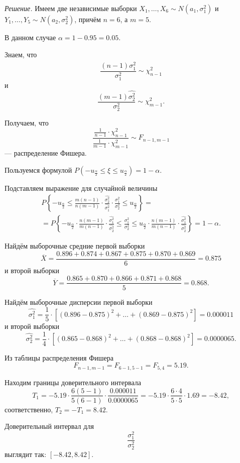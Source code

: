 \textit{Решение.}
Имеем две независимые выборки $X_1, \dotsc, X_6 \sim N \left( a_1, \sigma_1^2 \right) $ и
$Y_1, \dotsc, Y_5 \sim N \left( a_2, \sigma_2^2 \right) $, причём $n = 6$, а $m = 5$.

В данном случае $ \alpha = 1 - 0.95 = 0.05$.

Знаем, что
$$ \frac{ \left( n - 1 \right) \hat{ \sigma_1^2}}{ \sigma_1^2} \sim
  \chi_{n - 1}^2$$
и
$$ \frac{ \left( m - 1 \right) \hat{ \sigma_2^2}}{ \sigma_2^2} \sim
  \chi_{m - 1}^2.$$

Получаем, что
$$ \frac{ \frac{1}{n - 1} \cdot \chi_{n - 1}^2}{ \frac{1}{ m - 1} \cdot \chi_{m - 1}^2} \sim
  F_{n - 1, m - 1}$$
--- распределение Фишера.

Пользуемся формулой
$P \left( -u_{ \frac{ \alpha }{2}} \leq \xi \leq u_{ \frac{ \alpha }{2}} \right) =
  1 - \alpha $.

Подставляем выражение для случайной величины
\begin{equation*}
  \begin{split}
    P \left\{
      -u_{ \frac{ \alpha }{2}} \leq
      \frac{m \left( n - 1 \right) }{n \left( m - 1 \right) } \cdot
      \frac{ \hat{ \sigma_2^2}}{ \hat{ \sigma_1^2}} \cdot \frac{ \sigma_1^2}{ \sigma_2^2} \leq
      u_{ \frac{ \alpha }{2}}
    \right\} = \\
    = P \left\{
      -u_{ \frac{ \alpha }{2}} \cdot \frac{n \left( m - 1 \right) }{m \left( n - 1 \right) } \cdot
      \frac{ \hat{ \sigma_1^2}}{ \hat{ \sigma_2^2}} \leq
      \frac{ \sigma_1^2}{ \sigma_2^2} \leq
      u_{ \frac{ \alpha }{2}} \cdot \frac{n \left( m - 1 \right) }{m \left( n - 1 \right) } \cdot
      \frac{ \hat{ \sigma_1^2}}{ \hat{ \sigma_2^2}}
    \right\} =
    1 - \alpha.
  \end{split}
\end{equation*}

Найдём выборочные средние первой выборки
$$ \overline{X} =
  \frac{0.896 + 0.874 + 0.867 + 0.875 + 0.870 + 0.869}{6} =
  0.875$$
и второй выборки
$$ \overline{Y} =
  \frac{0.865 + 0.870 + 0.866 + 0.871 + 0.868}{5} =
  0.868.$$

Найдём выборочные дисперсии первой выборки
$$ \hat{ \sigma_1^2} =
  \frac{1}{5} \cdot
  \left[ \left( 0.896 - 0.875 \right)^2 + \dotsc + \left( 0.869 - 0.875 \right)^2 \right] =
  0.000011$$
и второй выборки
$$ \hat{ \sigma_2^2} =
  \frac{1}{4} \cdot
  \left[ \left( 0.865 - 0.868 \right)^2 + \dotsc + \left( 0.868 - 0.868 \right)^2 \right] =
  0.0000065.$$

Из таблицы распределения Фишера
$$F_{n - 1, m - 1} =
  F_{6 - 1, 5 - 1} =
  F_{5, 4} =
  5.19.$$

Находим границы доверительного интервала
$$T_1 =
  -5.19 \cdot \frac{6 \left( 5 - 1 \right) }{5 \left( 6 - 1 \right) } \cdot
  \frac{0.000011}{0.0000065} =
  -5.19 \cdot \frac{6 \cdot 4}{5 \cdot 5} \cdot 1.69 =
  -8.42,$$
соответственно, $T_2 = -T_1 = 8.42$.

Доверительный интервал для
$$ \frac{ \sigma_1^2}{ \sigma_2^2}$$
выглядит так: $ \left[ -8.42, 8.42 \right] $.

